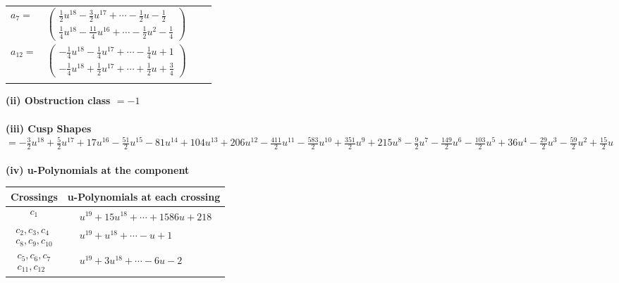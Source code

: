 \documentclass[1p]{elsarticle_modified}
\theoremstyle{definition}
\begin{document}
\begin{tabular}{m{7pt} m{180pt} m{7pt} m{180pt} }
\flushright $a_{7}=$&$\begin{pmatrix}\frac{1}{2} u^{18}-\frac{3}{2} u^{17}+\cdots-\frac{1}{2} u-\frac{1}{2}\\\frac{1}{4} u^{18}-\frac{11}{4} u^{16}+\cdots-\frac{1}{2} u^2-\frac{1}{4}\end{pmatrix}$ \\
\flushright $a_{12}=$&$\begin{pmatrix}-\frac{1}{4} u^{18}-\frac{1}{4} u^{17}+\cdots-\frac{1}{4} u+1\\-\frac{1}{4} u^{18}+\frac{1}{2} u^{17}+\cdots+\frac{1}{2} u+\frac{3}{4}\end{pmatrix}$\\&\end{tabular}
\flushleft \textbf{(ii) Obstruction class $= -1$}\\~\\
\flushleft \textbf{(iii) Cusp Shapes $= -\frac{3}{2} u^{18}+\frac{5}{2} u^{17}+17 u^{16}-\frac{51}{2} u^{15}-81 u^{14}+104 u^{13}+206 u^{12}-\frac{411}{2} u^{11}-\frac{583}{2} u^{10}+\frac{351}{2} u^9+215 u^8-\frac{9}{2} u^7-\frac{149}{2} u^6-\frac{103}{2} u^5+36 u^4-\frac{29}{2} u^3-\frac{59}{2} u^2+\frac{15}{2} u$}\\~\\
\newpage\renewcommand{\arraystretch}{1}
\flushleft \textbf{(iv) u-Polynomials at the component}\newline \\
\begin{tabular}{m{50pt}|m{274pt}}
Crossings & \hspace{64pt}u-Polynomials at each crossing \\
\hline $$\begin{aligned}c_{1}\end{aligned}$$&$\begin{aligned}
&u^{19}+15 u^{18}+\cdots+1586 u+218
\end{aligned}$\\
\hline $$\begin{aligned}c_{2},c_{3},c_{4}\\c_{8},c_{9},c_{10}\end{aligned}$$&$\begin{aligned}
&u^{19}+u^{18}+\cdots- u+1
\end{aligned}$\\
\hline $$\begin{aligned}c_{5},c_{6},c_{7}\\c_{11},c_{12}\end{aligned}$$&$\begin{aligned}
&u^{19}+3 u^{18}+\cdots-6 u-2
\end{aligned}$\\
\hline
\end{tabular}\\~\\
\end{document}
